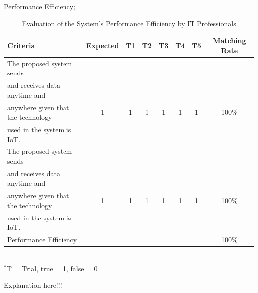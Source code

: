 \indent\indent Performance Efficiency; \\
\begin{table}[h!]
\caption{Evaluation of the System’s Performance Efficiency by IT Professionals}
\vspace{-1em}
\begin{center}
\fontsize{10}{12}\selectfont
\begin{tabular}{|| l c c c c c c c ||} 
 \hline
 Criteria & Expected & T1 & T2 & T3 & T4 & T5 & Matching Rate \\ [0.5ex] 
 \hline\hline
The proposed system sends &  &  &  &  &  &  &  \\
and receives data anytime and &  &  &  &  &  &  &  \\
anywhere given that the technology & 1 & 1 & 1 & 1 & 1 & 1 & 100\% \\
used in the system is IoT. &  &  &  &  &  &  &  \\ 
\hline
The proposed system sends &  &  &  &  &  &  &  \\
and receives data anytime and &  &  &  &  &  &  &  \\
anywhere given that the technology & 1 & 1 & 1 & 1 & 1 & 1 & 100\% \\
used in the system is IoT. &  &  &  &  &  &  &  \\ 
\hline
Performance Efficiency &  &  &  &  &  &  & 100\% \\ 
\hline
\end{tabular} \\
\footnotesize{\hspace{-10cm}$^*$T = Trial, true = 1, false = 0}
\end{center}
\end{table} 

Explanation here!!! \lipsum[1] \\


